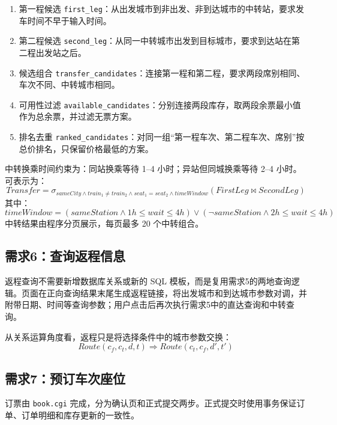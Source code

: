 \documentclass[10pt,a4paper]{article}
\begin{document}
\begin{enumerate}
    \item 第一程候选 \texttt{first\_leg}：从出发城市到非出发、非到达城市的中转站，要求发车时间不早于输入时间。
    \item 第二程候选 \texttt{second\_leg}：从同一中转城市出发到目标城市，要求到达站在第二程出发站之后。
    \item 候选组合 \texttt{transfer\_candidates}：连接第一程和第二程，要求两段席别相同、车次不同、中转城市相同。
    \item 可用性过滤 \texttt{available\_candidates}：分别连接两段库存，取两段余票最小值作为总余票，并过滤无票方案。
    \item 排名去重 \texttt{ranked\_candidates}：对同一组“第一程车次、第二程车次、席别”按总价排名，只保留价格最低的方案。
\end{enumerate}

中转换乘时间约束为：同站换乘等待 1--4 小时；异站但同城换乘等待 2--4 小时。可表示为：
\[
Transfer=\sigma_{sameCity \land train_1\neq train_2 \land seat_1=seat_2 \land timeWindow}
(FirstLeg \bowtie SecondLeg)
\]
其中：
\[
timeWindow=(sameStation \land 1h\leq wait\leq4h)\lor(\neg sameStation \land 2h\leq wait\leq4h)
\]
中转结果由程序分页展示，每页最多 20 个中转组合。

\subsection{需求6：查询返程信息}

返程查询不需要新增数据库关系或新的 SQL 模板，而是复用需求5的两地查询逻辑。页面在正向查询结果末尾生成返程链接，将出发城市和到达城市参数对调，并附带日期、时间等查询参数；用户点击后再次执行需求5中的直达查询和中转查询。

从关系运算角度看，返程只是将选择条件中的城市参数交换：
\[
Route(c_f,c_t,d,t) \Rightarrow Route(c_t,c_f,d',t')
\]

\subsection{需求7：预订车次座位}

订票由 \texttt{book.cgi} 完成，分为确认页和正式提交两步。正式提交时使用事务保证订单、订单明细和库存更新的一致性。
\end{document}
